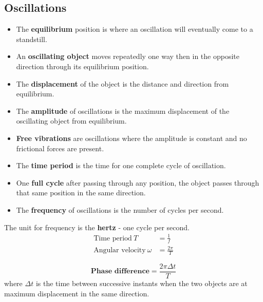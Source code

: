 \subsection{Oscillations}

\begin{itemize}
    \item The \textbf{equilibrium} position is where an oscillation will eventually come to a standstill.
    \item An \textbf{oscillating object} moves repeatedly one way then in the opposite direction through its equilibrium position.
    \item The \textbf{displacement} of the object is the distance and direction from equilibrium.
    \item The \textbf{amplitude} of oscillations is the maximum displacement of the oscillating object from equilibrium.
    \item \textbf{Free vibrations} are oscillations where the amplitude is constant and no frictional forces are present.
    \item The \textbf{time period} is the time for one complete cycle of oscillation.
    \item One \textbf{full cycle} after passing through any position, the object passes through that same position in the same direction.
    \item The \textbf{frequency} of oscillations is the number of cycles per second.
\end{itemize}
The unit for frequency is the \textbf{hertz} - one cycle per second.
\begin{align*}
    \text{Time period}\ T&=\frac{1}{f}\\
    \text{Angular velocity}\ \omega&=\frac{2\pi}{T}
\end{align*}

$$\textbf{Phase difference}=\frac{2\pi\Delta t}{T}$$
where $\Delta t$ is the time between successive instants when the two objects are at maximum displacement in the same direction.
